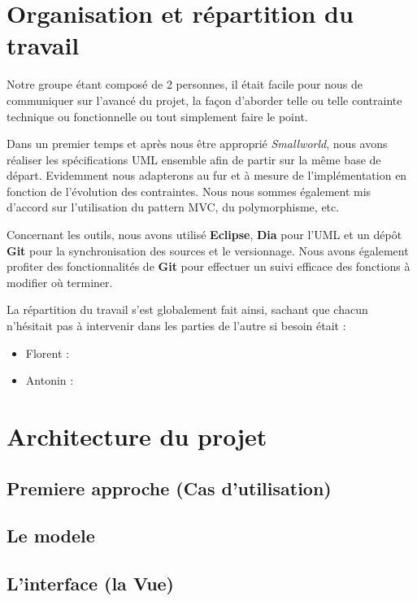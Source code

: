 \documentclass[a4paper]{report}
\begin{document}
\newpage
\chapter{Organisation et répartition du travail}
\par
Notre groupe étant composé de 2 personnes, il était facile pour nous de
communiquer sur l'avancé du projet, la façon d'aborder telle ou telle contrainte
technique ou fonctionnelle ou tout simplement faire le point.
\par
Dans un premier temps et après nous être approprié \textit{Smallworld}, nous
avons réaliser les spécifications UML ensemble afin de partir sur la même base
de départ. Evidemment nous adapterons au fur et à mesure de l'implémentation en
fonction de l'évolution des contraintes. Nous nous sommes également mis d'accord
sur l'utilisation du pattern MVC, du polymorphisme, etc.
\par
Concernant les outils, nous avons utilisé \textbf{Eclipse}, \textbf{Dia} pour
l'UML et un dépôt \textbf{Git} pour la synchronisation des sources et le
versionnage. Nous avons également profiter des fonctionnalités de \textbf{Git}
pour effectuer un suivi efficace des fonctions à modifier où terminer.
\par
La répartition du travail s'est globalement fait ainsi, sachant que chacun
n'hésitait pas à intervenir dans les parties de l'autre si besoin était :
\begin{itemize}
    \item Florent : %
    \item Antonin : %
\end{itemize}

\newpage
\chapter{Architecture du projet}
\section{Premiere approche (Cas d'utilisation)}


\section{Le modele}


\section{L'interface (la Vue)}
\end{document}
